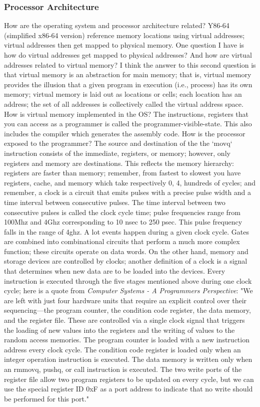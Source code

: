 \documentclass[10pt]{article}
\begin{document}
\subsubsection{Processor Architecture}
How are the operating system and processor architecture related? Y86-64 (simplified x86-64 version) reference memory locations using virtual addresses; virtual addresses then get mapped to physical memory. One question I have is how do virtual addresses get mapped to physical addresses? And how are virtual addresses related to virtual memory? I think the answer to this second question is that virtual memory is an abstraction for main memory; that is, virtual memory provides the illusion that a given program in execution (i.e., process) has its own memory; virtual memory is laid out as locations or cells; each location has an address; the set of all addresses is collectively called the virtual address space. How is virtual memory implemented in the OS?  The instructions, registers that you can access as a programmer is called the programmer-visible-state. This also includes the compiler which generates the assembly code. How is the processor exposed to the programmer? The source and destination of the the `movq` instruction consists of the immediate, registers, or memory; however, only registers and memory are destinations. This reflects the memory hierarchy: registers are faster than memory; remember, from fastest to slowest you have registers, cache, and memory which take respectively 0, 4, hundreds of cycles; and remember, a clock is a circuit that emits pulses with a precise pulse width and a time interval between consecutive pulses. The time interval between two consecutive pulses is called the clock cycle time; pulse frequencies range from 100Mhz and 4Ghz corresponding to 10 nsec to 250 psec. This pulse frequency falls in the range of 4ghz. A lot events happen during a given clock cycle. Gates are combined into combinational circuits that perform a much more complex function; these circuits operate on data words. On the other hand, memory and storage devices are controlled by clocks; another definition of a clock is a signal that determines when new data are to be loaded into the devices. Every instruction is executed through the five stages mentioned above during one clock cycle; here is a quote from \textit{Computer Systems - A Programmers Perspective}: "We are left with just four hardware units that require an explicit control over their sequencing—the program counter, the condition code register, the data memory, and the register file. These are controlled via a single clock signal that triggers the loading of new values into the registers and the writing of values to the random access memories. The program counter is loaded with a new instruction address every clock cycle. The condition code register is loaded only when an integer operation instruction is executed. The data memory is written only when an rmmovq, pushq, or call instruction is executed. The two write ports of the register file allow two program registers to be updated on every cycle, but we can use the special register ID 0xF as a port address to indicate that no write should be performed for this port."
\end{document}
